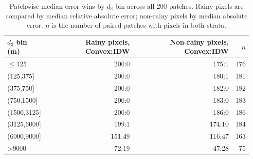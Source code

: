 \begin{table}[t]\centering\begin{tabular}{lrrr}
\toprule $d_3$ bin (m) & Rainy pixels, Convex:IDW & Non-rainy pixels, Convex:IDW & $n$ \\
\midrule
$\leq$125 & 200:0 & 175:1 & 176 \\
(125,375] & 200:0 & 180:1 & 181 \\
(375,750] & 200:0 & 182:0 & 182 \\
(750,1500] & 200:0 & 183:0 & 183 \\
(1500,3125] & 200:0 & 186:0 & 186 \\
(3125,6000] & 199:1 & 174:10 & 184 \\
(6000,9000] & 151:49 & 116:47 & 163 \\
>9000 & 72:19 & 47:28 & 75 \\
\bottomrule\end{tabular}
\caption{Patchwise median-error wins by $d_3$ bin across all 200 patches. Rainy pixels are compared by median relative absolute error; non-rainy pixels by median absolute error. $n$ is the number of paired patches with pixels in both strata.}
\label{tab:distance-bin-win-counts}
\end{table}
